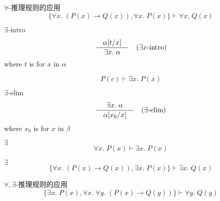 \begin{frame}{}
  \begin{exampleblock}{$\forall$-推理规则的应用}
    \[
      \Big\{\forall x.\; (P(x) \to Q(x)), \forall x.\; P(x)\Big\} \vdash \forall x.\; Q(x)
    \]
  \end{exampleblock}
\end{frame}

\begin{frame}{$\exists\text{-intro}$}
  \begin{center}
    \[
      \frac{\quad\alpha[t/x]\quad}{\quad\exists x.\; \alpha\quad} \quad (\exists x\text{-intro})
    \]
    where $t$ is  for $x$ in $\alpha$
  \end{center}

  \pause
  \[
    P(c) \vdash \exists x.\; P(x)
  \]
\end{frame}

\begin{frame}{$\exists\text{-elim}$}
  \begin{center}
    \[
      \frac{\quad\exists x.\; \alpha\quad}{\quad\alpha[x_{0}/x]\quad} \quad (\exists\text{-elim})
    \]
  where $x_{0}$ is  for $x$ in $\beta$
  \end{center}
\end{frame}

\begin{frame}{$\exists$}
  \[
    \forall x.\; P(x) \vdash \exists x.\; P(x)
  \]
\end{frame}

\begin{frame}{$\exists$}
  \[
    \Big\{\forall x.\; (P(x) \to Q(x)), \exists x.\; P(x)\Big\}
      \vdash \exists x.\; Q(x)
  \]
\end{frame}

\begin{frame}{$\forall, \exists$-推理规则的应用}
  \[
    \Big\{\exists x.\; P(x), \forall x.\; \forall y.\; (P(x) \to Q(y))\Big\}
      \vdash \forall y.\; Q(y)
  \]
\end{frame}

